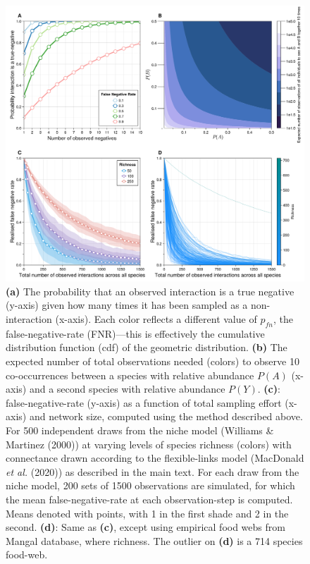 \documentclass[10pt,oneside]{article}
\makeatletter
\def\maxwidth{\ifdim\Gin@nat@width>\linewidth\linewidth
\else\Gin@nat@width\fi}
\let\Oldincludegraphics\includegraphics
\renewcommand{\includegraphics}[1]{\Oldincludegraphics[width=\maxwidth]{#1}}
\makeatother
\begin{document}
\begin{figure}
\hypertarget{fig:geometric}{%
\centering
\includegraphics{./figures/fig1.png}
\caption{\textbf{(a)} The probability that an observed interaction is a
true negative (y-axis) given how many times it has been sampled as a
non-interaction (x-axis). Each color reflects a different value of
\(p_{fn}\), the false-negative-rate (FNR)---this is effectively the
cumulative distribution function (cdf) of the geometric distribution.
\textbf{(b)} The expected number of total observations needed (colors)
to observe 10 co-occurrences between a species with relative abundance
\(P(A)\) (x-axis) and a second species with relative abundance \(P(Y)\).
\textbf{(c)}: false-negative-rate (y-axis) as a function of total
sampling effort (x-axis) and network size, computed using the method
described above. For 500 independent draws from the niche model
(Williams \& Martinez (2000)) at varying levels of species richness
(colors) with connectance drawn according to the flexible-links model
(MacDonald \emph{et al.} (2020)) as described in the main text. For each
draw from the niche model, 200 sets of 1500 observations are simulated,
for which the mean false-negative-rate at each observation-step is
computed. Means denoted with points, with 1 in the first shade and 2 in
the second. \textbf{(d)}: Same as \textbf{(c)}, except using empirical
food webs from Mangal database, where richness. The outlier on
\textbf{(d)} is a 714 species food-web.}\label{fig:geometric}
}
\end{figure}
\end{document}
